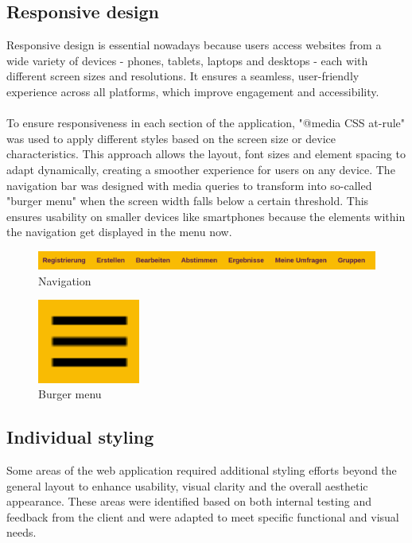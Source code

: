 \documentclass[a4paper,12pt]{report}
\begin{document}
\subsection{Responsive design}
Responsive design is essential nowadays because users access websites from a wide variety of devices - phones, tablets, laptops and desktops - each with different screen sizes and resolutions. It ensures a seamless, user-friendly experience across all platforms, which improve engagement and accessibility.\\ \\
To ensure responsiveness in each section of the application, "@media CSS at-rule" was used to apply different styles based on the screen size or device characteristics. This approach allows the layout, font sizes and element spacing to adapt dynamically, creating a smoother experience for users on any device. The navigation bar was designed with media queries to transform into so-called "burger menu" when the screen width falls below a certain threshold. This ensures usability on smaller devices like smartphones because the elements within the navigation get displayed in the menu now.
\begin{figure}[h!]
	\centering
	\includegraphics[width=1\textwidth]{pics/navigation.png}
	\caption{Navigation}
	\label{fig:navigation}
\end{figure}
\begin{figure}[H]
	\centering
	\includegraphics[width=0.3\textwidth]{pics/burger_menu.png}
	\caption{Burger menu}
	\label{fig:burger_menu}
\end{figure}
\subsection{Individual styling}
Some areas of the web application required additional styling efforts beyond the general layout to enhance usability, visual clarity and the overall aesthetic appearance. These areas were identified based on both internal testing and feedback from the client and were adapted to meet specific functional and visual needs.
\end{document}
